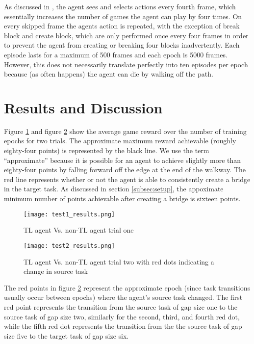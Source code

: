 \documentclass{llncs}
\begin{document}
As discussed in \citep{mnih2015human}, the agent sees and selects actions every fourth frame, which essentially increases the number of games the agent can play by four times. 
On every skipped frame the agents action is repeated, with the exception of break block and create block, which are only performed once every four frames in order to prevent the agent from creating or breaking four blocks inadvertently. 
Each episode lasts for a maximum of 500 frames and each epoch is 5000 frames. 
However, this does not necessarily translate perfectly into ten episodes per epoch because (as often happens) the agent can die by walking off the path.

\section{Results and Discussion}\label{sec:results}

Figure \ref{fig:res1} and figure \ref{fig:res2} show the average game reward over the number of training epochs for two trials. 
The approximate maximum reward achievable (roughly eighty-four points) is represented by the black line.
We use the term ``approximate'' because it is possible for an agent to achieve slightly more than eighty-four points by falling forward off the edge at the end of the walkway.
The red line represents whether or not the agent is able to consistently create a bridge in the target task. 
As discussed in section \ref{subsec:setup}, the appoximate minimum number of points achievable after creating a bridge is sixteen points.

\begin{figure}[H]
  \begin{center}
    \texttt{[image: test1\_results.png]}
  \end{center}
  \caption{TL agent Vs. non-TL agent trial one}
  \label{fig:res1}
\end{figure}


\begin{figure}[H]
  \begin{center}
    \texttt{[image: test2\_results.png]}
  \end{center}
  \caption{TL agent Vs. non-TL agent trial two with red dots indicating a change in source task}
  \label{fig:res2}
\end{figure}

The red points in figure \ref{fig:res2} represent the approximate epoch (since task transitions usually occur between epochs) where the agent's source task changed.  
The first red point represents the transition from the source task of gap size one to the source task of gap size two, similarly for the second, third, and fourth red dot, while the fifth red dot represents the transition from the the source task of gap size five to the target task of gap size six. 
\end{document}
